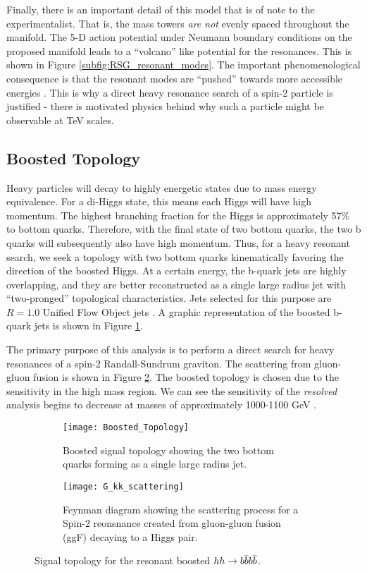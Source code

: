 \documentclass[12pt]{article}
\begin{document}
Finally, there is an important detail of this model that is of note to the
experimentalist. That is, the mass towers \textit{are not} evenly spaced
throughout the manifold. The 5-D action potential under Neumann boundary
conditions on the proposed manifold leads to a ``volcano'' like potential for
the resonances. This is shown in Figure \ref{subfig:RSG_resonant_modes}. The
important phenomenological consequence is that the resonant modes are ``pushed''
towards more accessible energies \cite{RandallSundrumOriginal, bsm}. This is why
a direct heavy resonance search of a spin-2 particle is justified - there is
motivated physics behind why such a particle might be observable at TeV scales.

\subsection{Boosted Topology}
Heavy particles will decay to highly energetic states due to mass energy
equivalence. For a di-Higgs state, this means each Higgs will have high
momentum. The highest branching fraction for the Higgs is approximately 57\% to
bottom quarks. Therefore, with the final state of two bottom quarks, the two b
quarks will subsequently also have high momentum. Thus, for a heavy resonant
search, we seek a topology with two bottom quarks kinematically favoring the
direction of the boosted Higgs. At a certain energy, the b-quark jets are highly
overlapping, and they are better reconstructed as a single large radius jet with
``two-pronged'' topological characteristics. Jets selected for this purpose are
$R=1.0$ Unified Flow Object jets \cite{boosted_hbbcc_tagger, large_r_jet}. A
graphic representation of the boosted b-quark jets is shown in Figure
\ref{subfig:boosted_topology}. 

The primary purpose of this analysis is to perform a direct search for heavy
resonances of a spin-2 Randall-Sundrum graviton. The scattering from gluon-gluon
fusion is shown in Figure \ref{subfig:feynman}. The boosted topology is chosen
due to the sensitivity in the high mass region. We can see the sensitivity of
the \textit{resolved} analysis begins to decrease at masses of approximately
1000-1100 GeV \cite{atlas_resonant_2022}. 


\begin{figure}[t!]
    \centering
    \begin{subfigure}[t]{.48\textwidth}
        \centering
        \texttt{[image: Boosted\_Topology]}
        \caption{Boosted signal topology showing the two bottom quarks forming as a single large radius jet.}
        \label{subfig:boosted_topology}
    \end{subfigure}
    \hfill
    \begin{subfigure}[t]{.48\textwidth}
        \centering
        \texttt{[image: G\_kk\_scattering]}
        \caption{Feynman diagram showing the scattering process for a Spin-2
        reonsnance created from gluon-gluon fusion (ggF) decaying to a Higgs pair.}
        \label{subfig:feynman}
    \end{subfigure}
    \caption{Signal topology for the resonant boosted $hh\rightarrow b\overline{b}b\overline{b}$.}
\label{fig:signal_topologies}
\end{figure}
\end{document}
